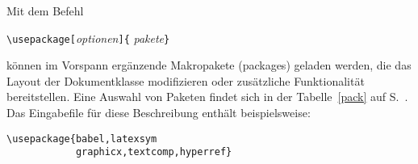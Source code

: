 Mit dem Befehl
\begin{beispiel}
\verb:\usepackage[:\textit{optionen}\verb:]{:%
  \textit{pakete}\verb:}:
\end{beispiel}
können im Vorspann ergänzende Makropakete (packages) geladen werden, die das 
Layout der Dokumentklasse modifizieren oder zusätzliche Funktionalität 
bereitstellen. Eine Auswahl von Paketen findet sich in der Tabelle~\ref{pack} 
auf S.~\pageref{pack}. Das Eingabefile für diese Beschreibung enthält 
beispielsweise:
\begin{beispiel}
\verb|\usepackage{babel,latexsym|\\
\verb|            graphicx,textcomp,hyperref}|
\end{beispiel}
